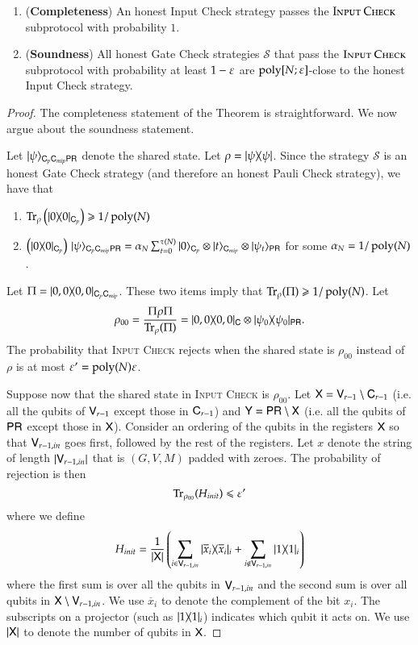 \begin{lemma}	
\label{lem:input_check}
\leavevmode
\begin{enumerate}
	\item (\textbf{Completeness}) An honest Input Check strategy passes the $\textsc{Input Check}$ subprotocol with probability $1$. 
	\item (\textbf{Soundness}) All honest Gate Check strategies $\mathcal{S}$ that pass the $\textsc{Input Check}$ subprotocol with probability at least $1 - \varepsilon$ are $\operatorname{poly}[N;\varepsilon]$-close to the honest Input Check strategy.
\end{enumerate}
\end{lemma}
\begin{proof}
The completeness statement of the Theorem is straightforward. We now argue about the soundness statement.

Let $|\psi\rangle_{{\mathsf{C}}_p {\mathsf{C}}_{mip} {\mathsf{P}} {\mathsf{R}}}$ denote the shared state. Let $\rho = |\psi\rangle\! \langle \psi|$. Since the strategy $\mathcal{S}$ is an honest Gate Check strategy (and therefore an honest Pauli Check strategy), we have that
\begin{enumerate}
	\item $\operatorname{Tr}_\rho \left ( |0\rangle\! \langle 0|_{{\mathsf{C}}_p} \right) \geqslant 1/\operatorname{poly}(N)$
	\item $	\left( |0\rangle\! \langle 0|_{{\mathsf{C}}_p} \right) \, |\psi\rangle_{{\mathsf{C}}_p {\mathsf{C}}_{mip} {\mathsf{P}} {\mathsf{R}}} = \alpha_N \sum_{t = 0}^{\tau(N)} |0\rangle_{{\mathsf{C}}_p} \otimes |t\rangle_{{\mathsf{C}}_{mip}} \otimes |\psi_t\rangle_{{\mathsf{P}} {\mathsf{R}}}$ for some $\alpha_N = 1/\operatorname{poly}(N)$.
\end{enumerate}
Let $\Pi = |0,0\rangle\! \langle 0,0|_{{\mathsf{C}}_p {\mathsf{C}}_{mip}}$. These two items imply that $\operatorname{Tr}_\rho (\Pi) \geqslant 1/\operatorname{poly}(N)$. Let 
\[
	\rho_{00} = \frac{\Pi \rho \Pi}{\operatorname{Tr}_\rho (\Pi)} = |0,0\rangle\! \langle 0,0|_{{\mathsf{C}}} \otimes |\psi_0\rangle\! \langle \psi_0|_{{\mathsf{P}} {\mathsf{R}}}.
\]
The probability that \textsc{Input Check} rejects when the shared state is $\rho_{00}$ instead of $\rho$ is at most $\varepsilon' = \operatorname{poly}(N) \varepsilon$. 

Suppose now that the shared state in \textsc{Input Check} is $\rho_{00}$. Let ${\mathsf{X}} = {\mathsf{V}}_{r-1} \setminus {\mathsf{C}}_{r-1}$ (i.e. all the qubits of ${\mathsf{V}}_{r-1}$ except those in ${\mathsf{C}}_{r-1}$) and ${\mathsf{Y}} = {\mathsf{P}} {\mathsf{R}} \setminus {\mathsf{X}}$ (i.e. all the qubits of ${\mathsf{P}} {\mathsf{R}}$ except those in ${\mathsf{X}}$). Consider an ordering of the qubits in the registers ${\mathsf{X}}$  so that ${\mathsf{V}}_{r-1,in}$ goes first, followed by the rest of the registers. Let $x$ denote the string of length $|{\mathsf{V}}_{r-1,in}|$ that is $(G,V,M)$ padded with zeroes. The probability of rejection is then
	\begin{equation}
		\Tr_{\rho_{00}} ( H_{init} ) \leq \eps'
		\label{eq:init}
	\end{equation}
	where we define 
	\[
		H_{init} = \frac{1}{\left | {\mathsf{X}} \right|} \left ( \sum_{i \in {\mathsf{V}}_{r-1,in}} |\overline{x}_i\rangle\! \langle \overline{x}_i|_i +  \sum_{i \notin {\mathsf{V}}_{r-1,in}} |1\rangle\! \langle 1|_i \right)
	\] 
	where the first sum is over all the qubits in ${\mathsf{V}}_{r-1,in}$ and the second sum is over all qubits in ${\mathsf{X}} \setminus {\mathsf{V}}_{r-1,in}$. We use $\overline{x}_i$ to denote the complement of the bit $x_i$. The subscripts on a projector (such as $|1\rangle\! \langle 1|_i$) indicates which qubit it acts on. We use $|{\mathsf{X}}|$ to denote the number of qubits in ${\mathsf{X}}$. 
	

\end{proof}
